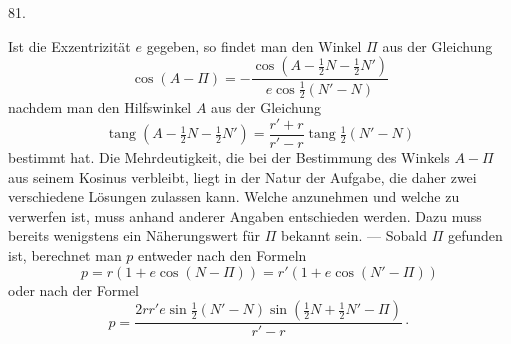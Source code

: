 \par{}\medskip
\hypertarget{native-110-article081}{}
\begin{center}81.\end{center}
Ist die Exzentrizität $e$ gegeben, so findet man den Winkel $\Pi$ aus der Gleichung
\[
\cos(A-\Pi)=-\frac{\cos(A-\tfrac12N-\tfrac12N')}{e\cos\tfrac12(N'-N)}
\]
nachdem man den Hilfswinkel $A$ aus der Gleichung
\[
\operatorname{tang}(A-\tfrac12N-\tfrac12N')=\frac{r'+r}{r'-r}\operatorname{tang}\tfrac12(N'-N)
\]
bestimmt hat. Die Mehrdeutigkeit, die bei der Bestimmung des Winkels $A-\Pi$ aus seinem Kosinus verbleibt, liegt in der Natur der Aufgabe, die daher zwei verschiedene Lösungen zulassen kann. Welche anzunehmen und welche zu verwerfen ist, muss anhand anderer Angaben entschieden werden. Dazu muss bereits wenigstens ein Näherungswert für $\Pi$ bekannt sein. — Sobald $\Pi$ gefunden ist, berechnet man $p$ entweder nach den Formeln
\[
p=r(1+e\cos(N-\Pi))=r'(1+e\cos(N'-\Pi))
\]
oder nach der Formel
\[
p=\frac{2rr'e\sin\tfrac12(N'-N)\sin(\tfrac12N+\tfrac12N'-\Pi)}{r'-r}\mathpunct{\cdot}
\]
